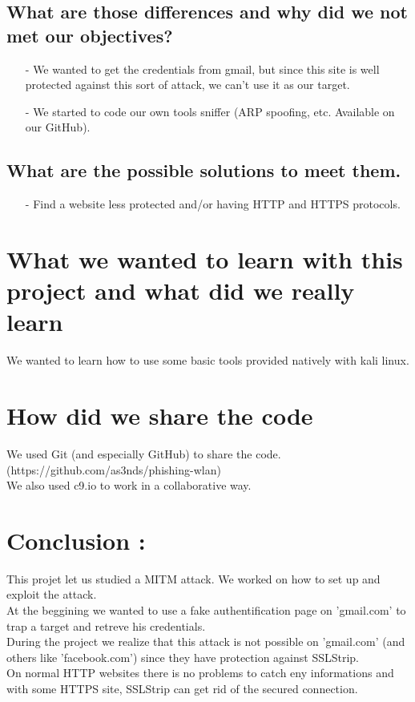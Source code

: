 \documentclass[a4paper, 11pt, oneside]{article}
\begin{document}
\subsection{What are those differences and why did we not met our objectives?}
\begin{itemize}
    \item[-] We wanted to get the credentials from gmail, but since this site is well protected against this sort of attack, we can't use it as our target.\\
    \item[-] We started to code our own tools sniffer (ARP spoofing, etc. Available on our GitHub).
\end{itemize}

\subsection{What are the possible solutions to meet them.}
\begin{itemize}
    \item[-] Find a website less protected and/or having HTTP and HTTPS protocols.\\
\end{itemize}

\section{What we wanted to learn with this project and what did we really learn}
We wanted to learn how to use some basic tools provided natively with kali linux.\\

\section{How did we share the code}
We used Git (and especially GitHub) to share the code. (https://github.com/as3nds/phishing-wlan)\\
We also used c9.io to work in a collaborative way.\\

\pagebreak
\section*{Conclusion :}
This projet let us studied a MITM attack. We worked on how to set up and exploit the attack. \\
At the beggining we wanted to use a fake authentification page on 'gmail.com' to trap a target and retreve his credentials. \\
During the project we realize that this attack is not possible on 'gmail.com' (and others like 'facebook.com') since they have protection against SSLStrip.\\
On normal HTTP websites there is no problems to catch eny informations and with some HTTPS site, SSLStrip can get rid of the secured connection.\\
\end{document}
